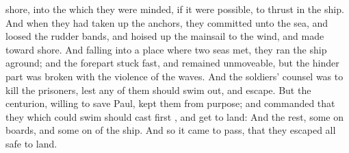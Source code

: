 {shore,
into the
which they were
minded,
if it were
possible, to
thrust in the
ship.
And when they had taken
up the
anchors, they
committed
{}
unto the
sea,
and
loosed the
rudder
bands,
and hoised
up the
mainsail to the
wind, and
made
toward
shore.
And
falling
into a
place where two seas
met, they
ran the
ship
aground;
and the
forepart stuck
fast, and
remained
unmoveable,
but the hinder
part was
broken
with the
violence of the
waves.
And the
soldiers’
counsel
was
to
kill the
prisoners,
lest
any of them should swim
out, and
escape.
But the
centurion,
willing to
save
Paul,
kept
them
from
{}
purpose;
and commanded
that
they which
could
swim should
cast
{}
first
{}, and
get
to
land:
And the
rest,
some
on
boards,
and
some
on
{}
of the
ship.
And
so it came to
pass, that they
escaped
all
safe
to
land.

}
